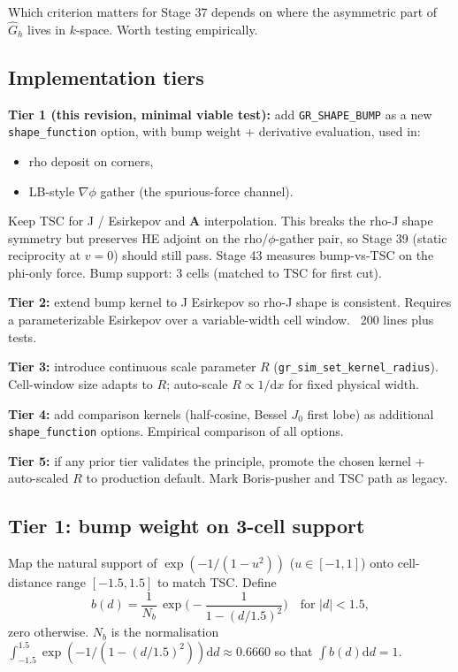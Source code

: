 \documentclass[11pt,a4paper]{article}
\newcommand{\vv}[1]{\mathbf{#1}}
\newcommand{\dd}{\mathrm{d}}
\begin{document}
Which criterion matters for Stage 37 depends on where the asymmetric
part of $\hat G_h$ lives in $k$-space.  Worth testing empirically.

\subsection{Implementation tiers}

\textbf{Tier 1 (this revision, minimal viable test):}
add \texttt{GR\_SHAPE\_BUMP} as a new \texttt{shape\_function}
option, with bump weight + derivative evaluation, used in:
\begin{itemize}
  \item rho deposit on corners,
  \item LB-style $\nabla \phi$ gather (the spurious-force channel).
\end{itemize}
Keep TSC for J / Esirkepov and $\vv A$ interpolation.  This breaks
the rho-J shape symmetry but preserves HE adjoint on the
rho/$\phi$-gather pair, so Stage 39 (static reciprocity at $v=0$)
should still pass.  Stage 43 measures bump-vs-TSC on the phi-only
force.  Bump support: 3 cells (matched to TSC for first cut).

\textbf{Tier 2:} extend bump kernel to J Esirkepov so rho-J shape
is consistent.  Requires a parameterizable Esirkepov over a
variable-width cell window.  ~200 lines plus tests.

\textbf{Tier 3:} introduce continuous scale parameter $R$
(\texttt{gr\_sim\_set\_kernel\_radius}).  Cell-window size adapts
to $R$; auto-scale $R \propto 1/\dd x$ for fixed physical width.

\textbf{Tier 4:} add comparison kernels (half-cosine, Bessel $J_0$
first lobe) as additional \texttt{shape\_function} options.
Empirical comparison of all options.

\textbf{Tier 5:} if any prior tier validates the principle,
promote the chosen kernel + auto-scaled $R$ to production default.
Mark Boris-pusher and TSC path as legacy.

\subsection{Tier 1: bump weight on 3-cell support}

Map the natural support of $\exp(-1/(1-u^2))$ ($u \in [-1, 1]$) onto
cell-distance range $[-1.5, 1.5]$ to match TSC.  Define
$$
b(d) = \frac{1}{N_b}\,\exp\!\bigg(\!\!-\frac{1}{1 - (d/1.5)^2}\bigg)
\quad\text{for } |d| < 1.5,
$$
zero otherwise.  $N_b$ is the normalisation
$\int_{-1.5}^{1.5} \exp(-1/(1-(d/1.5)^2)) \dd d \approx 0.6660$ so
that $\int b(d) \dd d = 1$.
\end{document}
